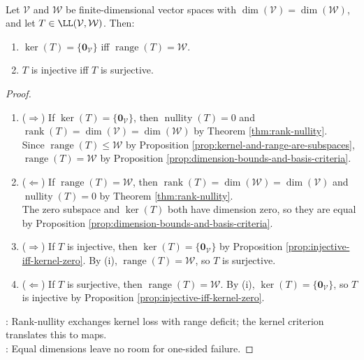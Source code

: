 \begin{corollary} \label{cor:equal-dimension-kernel-range} \\
Let $\mathcal{V}$ and $\mathcal{W}$ be finite-dimensional vector spaces with $\dim(\mathcal{V})=\dim(\mathcal{W})$, and let $T\in\LL(\mathcal{V},\mathcal{W})$. Then:
\begin{enumerate}[label=(\roman*)]
\setlength{\itemsep}{0pt}
\item $\ker(T)=\{\mathbf{0}_{\mathcal{V}}\}$ iff $\operatorname{range}(T)=\mathcal{W}$.
\item $T$ is injective iff $T$ is surjective.
\end{enumerate}
\begin{proof}
\begin{enumerate}[label=(\roman*)]
\setlength{\itemsep}{0pt}
\item[$(i)$] ($\Rightarrow$) If $\ker(T)=\{\mathbf{0}_{\mathcal{V}}\}$, then $\operatorname{nullity}(T)=0$ and $\operatorname{rank}(T)=\dim(\mathcal{V})=\dim(\mathcal{W})$ by Theorem \ref{thm:rank-nullity}.\\
Since $\operatorname{range}(T)\leq\mathcal{W}$ by Proposition \ref{prop:kernel-and-range-are-subspaces}, $\operatorname{range}(T)=\mathcal{W}$ by Proposition \ref{prop:dimension-bounds-and-basis-criteria}.
\item[$(i)$] ($\Leftarrow$) If $\operatorname{range}(T)=\mathcal{W}$, then $\operatorname{rank}(T)=\dim(\mathcal{W})=\dim(\mathcal{V})$ and $\operatorname{nullity}(T)=0$ by Theorem \ref{thm:rank-nullity}.\\
The zero subspace and $\ker(T)$ both have dimension zero, so they are equal by Proposition \ref{prop:dimension-bounds-and-basis-criteria}.
\item[$(ii)$] ($\Rightarrow$) If $T$ is injective, then $\ker(T)=\{\mathbf{0}_{\mathcal{V}}\}$ by Proposition \ref{prop:injective-iff-kernel-zero}. By (i), $\operatorname{range}(T)=\mathcal{W}$, so $T$ is surjective.
\item[$(ii)$] ($\Leftarrow$) If $T$ is surjective, then $\operatorname{range}(T)=\mathcal{W}$. By (i), $\ker(T)=\{\mathbf{0}_{\mathcal{V}}\}$, so $T$ is injective by Proposition \ref{prop:injective-iff-kernel-zero}.
\end{enumerate}
: Rank-nullity exchanges kernel loss with range deficit; the kernel criterion translates this to maps.\\
: Equal dimensions leave no room for one-sided failure.
\end{proof}
\end{corollary}


